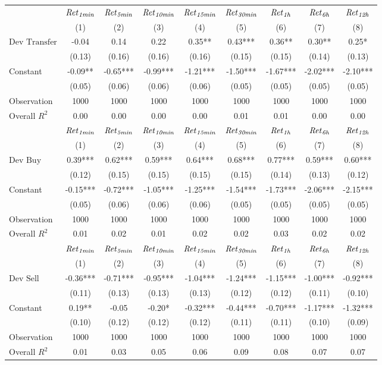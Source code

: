 \begin{tabular}{lcccccccc}
\hline
 & ${\it Ret}_{\it 1min}$ & ${\it Ret}_{\it 5min}$ & ${\it Ret}_{\it 10min}$ & ${\it Ret}_{\it 15min}$ & ${\it Ret}_{\it 30min}$ & ${\it Ret}_{\it 1h}$ & ${\it Ret}_{\it 6h}$ & ${\it Ret}_{\it 12h}$ \\
 & (1) & (2) & (3) & (4) & (5) & (6) & (7) & (8) \\
\hline
$\text{Dev Transfer}$ & -0.04 & 0.14 & 0.22 & 0.35** & 0.43*** & 0.36** & 0.30** & 0.25* \\
 & (0.13) & (0.16) & (0.16) & (0.16) & (0.15) & (0.15) & (0.14) & (0.13) \\
Constant & -0.09** & -0.65*** & -0.99*** & -1.21*** & -1.50*** & -1.67*** & -2.02*** & -2.10*** \\
 & (0.05) & (0.06) & (0.06) & (0.06) & (0.05) & (0.05) & (0.05) & (0.05) \\
Observation & 1000 & 1000 & 1000 & 1000 & 1000 & 1000 & 1000 & 1000 \\
Overall $R^2$ & 0.00 & 0.00 & 0.00 & 0.00 & 0.01 & 0.01 & 0.00 & 0.00 \\
\hline
 & ${\it Ret}_{\it 1min}$ & ${\it Ret}_{\it 5min}$ & ${\it Ret}_{\it 10min}$ & ${\it Ret}_{\it 15min}$ & ${\it Ret}_{\it 30min}$ & ${\it Ret}_{\it 1h}$ & ${\it Ret}_{\it 6h}$ & ${\it Ret}_{\it 12h}$ \\
 & (1) & (2) & (3) & (4) & (5) & (6) & (7) & (8) \\
\hline
$\text{Dev Buy}$ & 0.39*** & 0.62*** & 0.59*** & 0.64*** & 0.68*** & 0.77*** & 0.59*** & 0.60*** \\
 & (0.12) & (0.15) & (0.15) & (0.15) & (0.15) & (0.14) & (0.13) & (0.12) \\
Constant & -0.15*** & -0.72*** & -1.05*** & -1.25*** & -1.54*** & -1.73*** & -2.06*** & -2.15*** \\
 & (0.05) & (0.06) & (0.06) & (0.06) & (0.05) & (0.05) & (0.05) & (0.05) \\
Observation & 1000 & 1000 & 1000 & 1000 & 1000 & 1000 & 1000 & 1000 \\
Overall $R^2$ & 0.01 & 0.02 & 0.01 & 0.02 & 0.02 & 0.03 & 0.02 & 0.02 \\
\hline
 & ${\it Ret}_{\it 1min}$ & ${\it Ret}_{\it 5min}$ & ${\it Ret}_{\it 10min}$ & ${\it Ret}_{\it 15min}$ & ${\it Ret}_{\it 30min}$ & ${\it Ret}_{\it 1h}$ & ${\it Ret}_{\it 6h}$ & ${\it Ret}_{\it 12h}$ \\
 & (1) & (2) & (3) & (4) & (5) & (6) & (7) & (8) \\
\hline
$\text{Dev Sell}$ & -0.36*** & -0.71*** & -0.95*** & -1.04*** & -1.24*** & -1.15*** & -1.00*** & -0.92*** \\
 & (0.11) & (0.13) & (0.13) & (0.13) & (0.12) & (0.12) & (0.11) & (0.10) \\
Constant & 0.19** & -0.05 & -0.20* & -0.32*** & -0.44*** & -0.70*** & -1.17*** & -1.32*** \\
 & (0.10) & (0.12) & (0.12) & (0.12) & (0.11) & (0.11) & (0.10) & (0.09) \\
Observation & 1000 & 1000 & 1000 & 1000 & 1000 & 1000 & 1000 & 1000 \\
Overall $R^2$ & 0.01 & 0.03 & 0.05 & 0.06 & 0.09 & 0.08 & 0.07 & 0.07 \\
\hline
\end{tabular}
